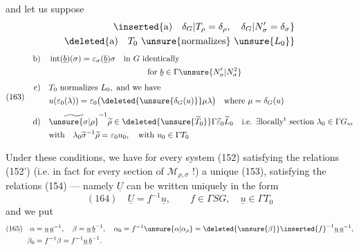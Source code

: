 and let us suppose 
\[
\begin{aligned}
\inserted{\text{a)}\quad\delta_G|T_\rho=\delta_\rho,\quad\delta_G|N'_\sigma=\delta_\sigma}\\
\deleted{\text{a)}\quad T_0\text{ \unsure{normalizes} }\unsure{L_0}}
\end{aligned}
\]
\[
(163)\quad
\begin{aligned}
\text{b)}\quad&\operatorname{int}(\underline b)(\sigma)=\varepsilon_\sigma(\underline b)\sigma
\quad\text{in }G\text{ identically}\\
&\hspace{12em}\text{for }\underline b\in\Gamma\unsure{N'_\sigma|N^2_\sigma}\\[4pt]
\text{c)}\quad&T_0\text{ normalizes }L_0,\text{ and we have}\\
&u(\varepsilon_0(\lambda))=
\varepsilon_0\bigl(\deleted{\unsure{\delta_G(u)}}\mu\lambda\bigr)
\quad\text{where }\mu=\delta_G(u)\\[4pt]
\text{d)}\quad&\widetilde{\unsure{\sigma|\rho}}^{-1}\widetilde\rho
\in\deleted{\unsure{\widetilde T_0}}\Gamma\widetilde\varepsilon_0\widetilde L_0
\quad\text{i.e. }\exists\text{locally}^{\text{t}}\text{ section }\lambda_0\in\Gamma G_m\\
&\text{with}\quad\lambda_0\widetilde\sigma^{-1}\widetilde\rho=\varepsilon_0u_0,
\quad\text{with }u_0\in\Gamma T_0
\end{aligned}
\]

Under these conditions, we have for every system (152) satisfying the relations (152') (i.e. in fact for every  section of $\mathcal M_{\rho,\sigma}$ !) a unique  (153), satisfying the relations (154) --- namely $\underline U$ can be written uniquely in the form
\[
(164)\quad\underline U=f^{-1}\underline u,\qquad f\in\Gamma SG,\quad\underline u\in\Gamma T_0
\]
and we put
\[
\begin{aligned}
(165)\quad\alpha&=\underline u\,\underline a^{-1},\quad
\beta=\underline u\,\underline b^{-1},\quad
\alpha_0=f^{-1}\unsure{\alpha|\alpha_\rho}=
\deleted{\unsure{\beta}}\inserted{f}^{-1}\underline u\,\underline a^{-1},\\
\beta_0&=f^{-1}\beta=f^{-1}\underline u\,\underline b^{-1}.
\end{aligned}
\]

